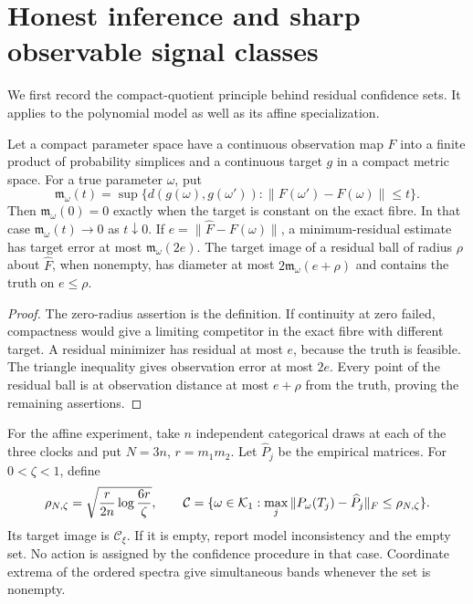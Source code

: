 \section{Honest inference and sharp observable signal classes}
\label{sec:statistics}
We first record the compact-quotient principle behind residual
confidence sets. It applies to the polynomial model as well as its
affine specialization.

\begin{lemma}\label{lem:modulus}
Let a compact parameter space have a continuous observation map $F$
into a finite product of probability simplices and a continuous target
$g$ in a compact metric space. For a true parameter $\omega$, put
\[
 \mathfrak m_\omega(t)=\sup\{d(g(\omega),g(\omega')):
                             \|F(\omega')-F(\omega)\|\le t\}.
\]
Then $\mathfrak m_\omega(0)=0$ exactly when the target is constant on
the exact fibre. In that case $\mathfrak m_\omega(t)\to0$ as
$t\downarrow0$. If $e=\|\widehat F-F(\omega)\|$, a minimum-residual
estimate has target error at most $\mathfrak m_\omega(2e)$.
The target image of a residual ball of radius $\rho$ about
$\widehat F$, when nonempty, has diameter at most
$2\mathfrak m_\omega(e+\rho)$ and contains the truth on $e\le\rho$.
\end{lemma}
\begin{proof}
The zero-radius assertion is the definition. If continuity at zero
failed, compactness would give a limiting competitor in the exact
fibre with different target. A residual minimizer has residual at most
$e$, because the truth is feasible. The triangle inequality gives
observation error at most $2e$. Every point of the residual ball is
at observation distance at most $e+\rho$ from the truth, proving the
remaining assertions.
\end{proof}

For the affine experiment, take $n$ independent categorical draws at
each of the three clocks and put $N=3n$, $r=m_1m_2$. Let
$\widehat P_j$ be the empirical matrices. For $0<\zeta<1$, define
\begin{equation}\label{eq:confidence}
 \rho_{N,\zeta}=\sqrt{\frac{r}{2n}\log\frac{6r}{\zeta}},
 \qquad
 \mathcal C=\{\omega\in\mathcal K_1:
          \max_j\|P_\omega(T_j)-\widehat P_j\|_F\le\rho_{N,\zeta}\}.
\end{equation}
Its target image is $\mathcal C_\xi$. If it is empty, report model
inconsistency and the empty set. No action is assigned by the confidence
procedure in that case. Coordinate extrema of the ordered spectra give
simultaneous bands whenever the set is nonempty.

